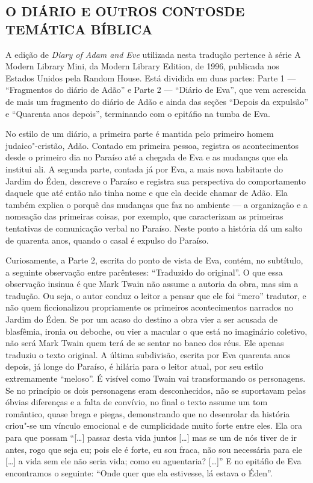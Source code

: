 \subsection{O DIÁRIO E OUTROS CONTOS\break DE TEMÁTICA BÍBLICA}

A edição de \textit{Diary of Adam and Eve} utilizada nesta tradução pertence à série
A Modern Library Mini, da Modern Library Edition, de 1996, publicada nos
Estados Unidos pela Random House. Está dividida em duas partes: Parte 1 ---
``Fragmentos do diário de Adão'' e Parte 2 --- 
``Diário de Eva'', que vem acrescida de mais
um fragmento do diário de Adão e ainda das seções
``Depois da expulsão'' e ``Quarenta
anos depois'', terminando com o epitáfio na tumba de Eva.

No estilo de um diário, a primeira parte é mantida pelo primeiro
homem judaico"-cristão, Adão. Contado em primeira pessoa, registra os
acontecimentos desde o primeiro dia no Paraíso até a chegada de Eva e as
mudanças que ela institui ali. A segunda parte, contada já por
Eva, a mais nova habitante do Jardim do Éden, descreve o Paraíso e
registra sua perspectiva do comportamento daquele que até então não
tinha nome e que ela decide chamar de Adão. Ela também explica o porquê
das mudanças que faz no ambiente --- a organização e a nomeação das
primeiras coisas, por exemplo, que caracterizam as primeiras tentativas
de comunicação verbal no Paraíso. Neste ponto a história dá um salto de
quarenta anos, quando o casal é expulso do Paraíso. 

Curiosamente, a Parte 2, escrita do ponto de vista de Eva, contém, no
subtítulo, a seguinte observação entre parênteses: “Traduzido do
original”. O que essa observação insinua é que Mark Twain não assume a
autoria da obra, mas sim a tradução. Ou seja, o autor conduz o leitor a
pensar que ele foi “mero” tradutor, e não quem ficcionalizou
propriamente os primeiros acontecimentos narrados no Jardim do Éden.
Se por um acaso do destino a obra vier a ser acusada de blasfêmia, ironia ou
deboche, ou vier a macular o que está no imaginário coletivo, não será Mark
Twain quem terá de se sentar no banco dos réus. Ele apenas traduziu o
texto original. A última subdivisão, escrita por Eva quarenta anos
depois, já longe do Paraíso, é hilária para o leitor atual, por seu estilo
extremamente “meloso”. É visível como Twain vai transformando os
personagens. Se no princípio os dois personagens eram desconhecidos, não
se suportavam pelas óbvias diferenças e a falta de convívio, no final o
texto assume um tom romântico, quase brega e piegas, demonstrando que no
desenrolar da história criou"-se um vínculo emocional e de
cumplicidade muito forte entre eles. Ela ora para que possam “[\ldots{}] passar desta vida juntos 
[\ldots{}] mas se um de nós tiver de ir antes, rogo que seja eu; pois ele
é forte, eu sou fraca, não sou necessária para ele [\ldots{}] a vida sem ele
não seria vida; como eu aguentaria? [\ldots{}]” E no epitáfio de Eva
encontramos o seguinte: “Onde quer que ela estivesse, lá estava o     
Éden”.

